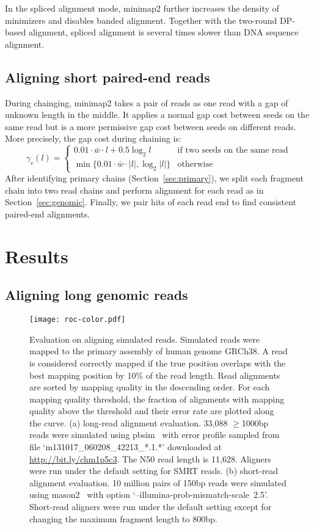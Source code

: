 \documentclass{bioinfo}
\begin{document}
\begin{methods}
In the spliced alignment mode, minimap2 further increases the density of
minimizers and disables banded alignment. Together with the two-round DP-based
alignment, spliced alignment is several times slower than DNA sequence
alignment.

\subsection{Aligning short paired-end reads}

During chainging, minimap2 takes a pair of reads as one read with a gap of
unknown length in the middle. It applies a normal gap cost between seeds on the
same read but is a more permissive gap cost between seeds on different reads.
More precisely, the gap cost during chaining is:
\[
\gamma_c(l)=\left\{\begin{array}{ll}
0.01\cdot\bar{w}\cdot l+0.5\log_2 l & \mbox{if two seeds on the same read} \\
\min\{0.01\cdot\bar{w}\cdot|l|,\log_2|l|\} & \mbox{otherwise}
\end{array}\right.
\]
After identifying primary chains (Section~\ref{sec:primary}), we split each
fragment chain into two read chains and perform alignment for each read as in
Section~\ref{sec:genomic}.  Finally, we pair hits of each read end to find
consistent paired-end alignments.

\end{methods}

\section{Results}

\subsection{Aligning long genomic reads}

\begin{figure}[!tb]
\centering
\texttt{[image: roc-color.pdf]}
\caption{Evaluation on aligning simulated reads. Simulated reads were mapped 
to the primary assembly of human genome GRCh38. A read is considered correctly
mapped if the true position overlaps with the best mapping position by 10\% of
the read length. Read alignments are sorted by mapping quality in the
descending order. For each mapping quality threshold, the fraction of
alignments with mapping quality above the threshold and their error rate are
plotted along the curve. (a) long-read alignment evaluation. 33,088 $\ge$1000bp
reads were simulated using pbsim~\citep{Ono:2013aa} with error profile sampled
from file `m131017\_060208\_42213\_*.1.*' downloaded at
\href{http://bit.ly/chm1p5c3}{http://bit.ly/chm1p5c3}. The N50 read length is
11,628. Aligners were run under the default setting for SMRT reads.
(b) short-read alignment evaluation. 10 million pairs of 150bp reads were
simulated using mason2~\citep{Holtgrewe:2010aa} with option
`\mbox{--illumina-prob-mismatch-scale 2.5}'. Short-read aligners were run under the
default setting except for changing the maximum fragment length to
800bp.}\label{fig:eval}
\end{figure}
\end{document}
